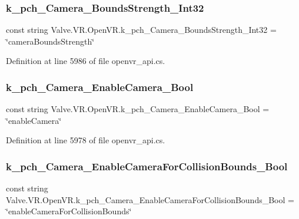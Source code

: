 \subsubsection{\texorpdfstring{k\_pch\_Camera\_BoundsStrength\_Int32}{k\_pch\_Camera\_BoundsStrength\_Int32}}
{\footnotesize\ttfamily const string Valve.\+V\+R.\+Open\+V\+R.\+k\+\_\+pch\+\_\+\+Camera\+\_\+\+Bounds\+Strength\+\_\+\+Int32 = \char`\"{}camera\+Bounds\+Strength\char`\"{}}



Definition at line 5986 of file openvr\+\_\+api.\+cs.

\mbox{\label{class_valve_1_1_v_r_1_1_open_v_r_a3dd3134b90e1469e6c1197493c0a10ad}} 
\subsubsection{\texorpdfstring{k\_pch\_Camera\_EnableCamera\_Bool}{k\_pch\_Camera\_EnableCamera\_Bool}}
{\footnotesize\ttfamily const string Valve.\+V\+R.\+Open\+V\+R.\+k\+\_\+pch\+\_\+\+Camera\+\_\+\+Enable\+Camera\+\_\+\+Bool = \char`\"{}enable\+Camera\char`\"{}}



Definition at line 5978 of file openvr\+\_\+api.\+cs.

\mbox{\label{class_valve_1_1_v_r_1_1_open_v_r_a7a6adced5762270d7df0d8477e4f4ffd}} 
\subsubsection{\texorpdfstring{k\_pch\_Camera\_EnableCameraForCollisionBounds\_Bool}{k\_pch\_Camera\_EnableCameraForCollisionBounds\_Bool}}
{\footnotesize\ttfamily const string Valve.\+V\+R.\+Open\+V\+R.\+k\+\_\+pch\+\_\+\+Camera\+\_\+\+Enable\+Camera\+For\+Collision\+Bounds\+\_\+\+Bool = \char`\"{}enable\+Camera\+For\+Collision\+Bounds\char`\"{}}



